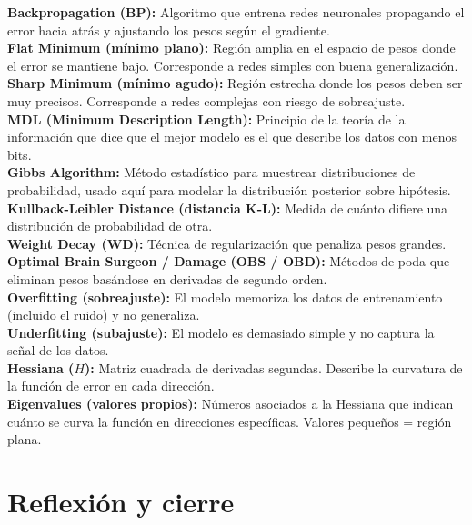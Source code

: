 \documentclass[11pt,a4paper]{article}
\begin{document}
\begin{tcolorbox}[colback=grisclaro,colframe=azul,title=Glosario de términos del artículo,breakable]
\textbf{Backpropagation (BP):} Algoritmo que entrena redes neuronales propagando el error hacia atrás y ajustando los pesos según el gradiente.\\[0.2cm]
\textbf{Flat Minimum (mínimo plano):} Región amplia en el espacio de pesos donde el error se mantiene bajo. Corresponde a redes simples con buena generalización.\\[0.2cm]
\textbf{Sharp Minimum (mínimo agudo):} Región estrecha donde los pesos deben ser muy precisos. Corresponde a redes complejas con riesgo de sobreajuste.\\[0.2cm]
\textbf{MDL (Minimum Description Length):} Principio de la teoría de la información que dice que el mejor modelo es el que describe los datos con menos bits.\\[0.2cm]
\textbf{Gibbs Algorithm:} Método estadístico para muestrear distribuciones de probabilidad, usado aquí para modelar la distribución posterior sobre hipótesis.\\[0.2cm]
\textbf{Kullback-Leibler Distance (distancia K-L):} Medida de cuánto difiere una distribución de probabilidad de otra.\\[0.2cm]
\textbf{Weight Decay (WD):} Técnica de regularización que penaliza pesos grandes.\\[0.2cm]
\textbf{Optimal Brain Surgeon / Damage (OBS / OBD):} Métodos de poda que eliminan pesos basándose en derivadas de segundo orden.\\[0.2cm]
\textbf{Overfitting (sobreajuste):} El modelo memoriza los datos de entrenamiento (incluido el ruido) y no generaliza.\\[0.2cm]
\textbf{Underfitting (subajuste):} El modelo es demasiado simple y no captura la señal de los datos.\\[0.2cm]
\textbf{Hessiana ($H$):} Matriz cuadrada de derivadas segundas. Describe la curvatura de la función de error en cada dirección.\\[0.2cm]
\textbf{Eigenvalues (valores propios):} Números asociados a la Hessiana que indican cuánto se curva la función en direcciones específicas. Valores pequeños = región plana.
\end{tcolorbox}

\section{Reflexión y cierre}
\label{sec:cierre}
\end{document}

